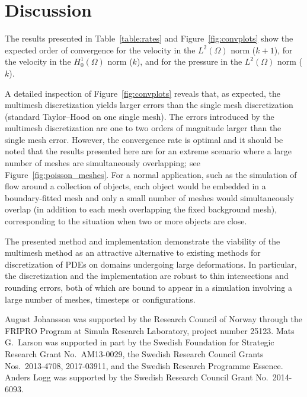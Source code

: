 \documentclass[graybox]{svmult}
\begin{document}
\section{Discussion}

The results presented in Table~\ref{table:rates} and Figure~\ref{fig:convplots} show the expected order of convergence for the velocity in the $L^2(\Omega)$ norm ($k + 1$), for the velocity in the $H^1_0(\Omega)$ norm ($k$), and for the pressure in the $L^2(\Omega)$ norm ($k$).

A detailed inspection of Figure~\ref{fig:convplots} reveals that, as expected, the multimesh discretization yields larger errors than the single mesh discretization (standard Taylor--Hood on one single mesh). The errors introduced by the multimesh discretization are one to two orders of magnitude larger than the single mesh error. However, the convergence rate is optimal and it should be noted that the results presented here are for an extreme scenario where a large number of meshes are simultaneously overlapping; see Figure~\ref{fig:poisson_meshes}. For a normal application, such as the simulation of flow around a collection of objects, each object would be embedded in a boundary-fitted mesh and only a small number of meshes would simultaneously overlap (in addition to each mesh overlapping the fixed background mesh), corresponding to the situation when two or more objects are close.

The presented method and implementation demonstrate the viability of the multimesh method as an attractive alternative to existing methods for discretization of PDEs on domains undergoing large deformations. In particular, the discretization and the implementation are robust to thin intersections and rounding errors, both of which are bound to appear in a simulation involving a large number of meshes, timesteps or configurations.

\begin{acknowledgement}
  August Johansson was supported by the Research Council of Norway through the FRIPRO Program at Simula Research Laboratory, project number 25123. Mats G.\ Larson was supported in part by the Swedish Foundation for Strategic Research Grant No.\ AM13-0029, the Swedish Research Council Grants Nos.\  2013-4708, 2017-03911, and the Swedish Research Programme Essence. Anders Logg was supported by the Swedish Research Council Grant No.\ 2014-6093.
\end{acknowledgement}




\end{document}
